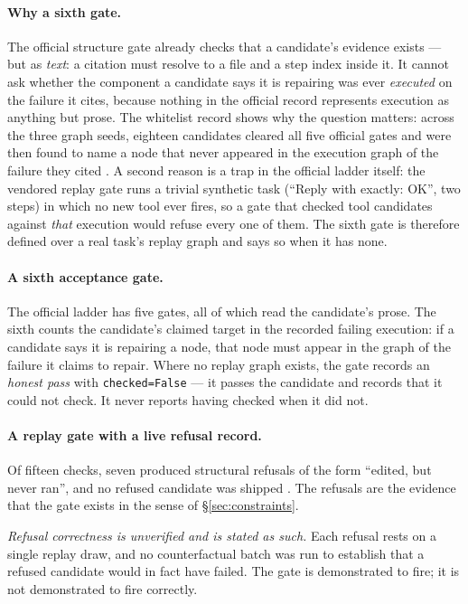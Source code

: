 \paragraph{Why a sixth gate.} The official structure gate already checks
that a candidate's evidence exists --- but as \emph{text}: a citation must
resolve to a file and a step index inside it. It cannot ask whether the
component a candidate says it is repairing was ever \emph{executed} on the
failure it cites, because nothing in the official record represents
execution as anything but prose. The whitelist record shows why the question
matters: across the three graph seeds, eighteen candidates cleared all
five official gates and were then found to name a node that never
appeared in the execution graph of the failure they cited . A
second reason is a trap in the official ladder itself: the
vendored replay gate runs a trivial synthetic task (``Reply with exactly:
OK'', two steps) in which no new tool ever fires, so a gate that checked
tool candidates against \emph{that} execution would refuse every one of
them. The sixth gate is therefore defined over a real task's replay graph
and says so when it has none.

\paragraph{A sixth acceptance gate.} The official ladder has five gates,
all of which read the candidate's prose. The sixth counts the candidate's
claimed target in the recorded failing execution: if a candidate says it is
repairing a node, that node must appear in the graph of the failure it
claims to repair. Where no replay graph exists, the gate records an
\emph{honest pass} with \texttt{checked=False} --- it passes the candidate
and records that it could not check. It never reports having checked when
it did not.

\paragraph{A replay gate with a live refusal record.} Of fifteen checks,
seven produced structural refusals of the form ``edited, but never ran'',
and no refused candidate was shipped . The refusals are the evidence
that the gate exists in the sense of \S\ref{sec:constraints}.

\emph{Refusal correctness is unverified and is stated as such.} Each
refusal rests on a single replay draw, and no counterfactual batch was run
to establish that a refused candidate would in fact have failed. The gate
is demonstrated to fire; it is not demonstrated to fire correctly.

